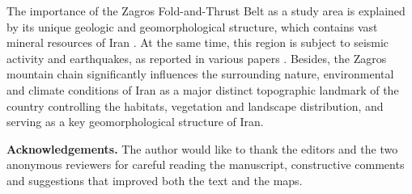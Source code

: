 \documentclass[12pt,a4paper,oneside]{article}
\def \newsection{\vspace{12pt}\textbf}
\def \newpar{\vspace{6pt}}
\begin{document}
\newpar The importance of the Zagros Fold-and-Thrust Belt as a study area is explained by its unique geologic and geomorphological structure, which contains vast mineral resources of Iran \citep{Sepehr,Regard,Motaghi2017,Saura}. At the same time, this region is subject to seismic activity and earthquakes, as reported in various papers \citep{Paul,Nissen,Yamini,Tavakoli,Talebian}. Besides, the Zagros mountain chain significantly influences the surrounding nature, environmental and climate conditions of Iran as a major distinct topographic landmark of the country controlling the habitats, vegetation and landscape distribution, and serving as a key geomorphological structure of Iran. 

\vspace{12pt}

{\bf Acknowledgements.} The author would like to thank the editors and the two anonymous reviewers for careful reading the manuscript, constructive comments and suggestions that improved both the text and the maps.


%
%
%


\end{document}
